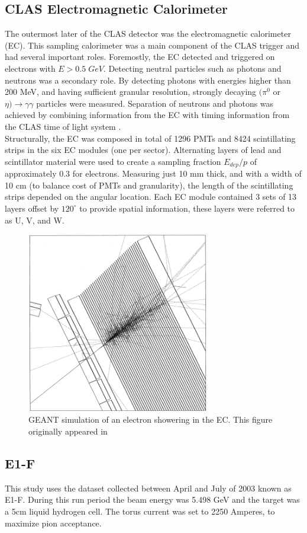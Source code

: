 \subsection{CLAS Electromagnetic Calorimeter}
The outermost later of the CLAS detector was the electromagnetic calorimeter (EC).  This sampling calorimeter was a main component of the CLAS trigger and had several important roles.  Foremostly, the EC detected and triggered on electrons with $E > 0.5 \; GeV$.  Detecting neutral particles such as photons and neutrons was a secondary role.  By detecting photons with energies higher than 200 MeV, and having sufficient granular resolution, strongly decaying $(\pi^0$ or $\eta) \rightarrow \gamma \gamma$ particles were measured.  Separation of neutrons and photons was achieved by combining information from the EC with timing information from the CLAS time of light system \cite{hardware-amarian:2001}.  \\
Structurally, the EC was composed in total of 1296 PMTs and 8424 scintillating strips in the six EC modules (one per sector).  Alternating layers of lead and scintillator material were used to create a sampling fraction $E_{dep}/p$ of approximately 0.3 for electrons.  Measuring just 10 mm thick, and with a width of 10 cm (to balance cost of PMTs and granularity), the length of the scintillating strips depended on the angular location.  Each EC module contained 3 sets of 13 layers offset by $120^\circ$ to provide spatial information, these layers were referred to as U, V, and W.  

\begin{figure}
	\centering
		\includegraphics[width=8cm]{image/diagrams/ec-shower-geant.png}
		\caption{GEANT simulation of an electron showering in the EC.  This figure originally appeared in \cite{hardware-amarian:2001}}
\end{figure}

\subsection{E1-F}
This study uses the dataset collected between April and July of 2003 known as E1-F.  During this run period the beam energy was 5.498 GeV and the target was a 5cm liquid hydrogen cell.  The torus current was set to 2250 Amperes, to maximize pion acceptance.